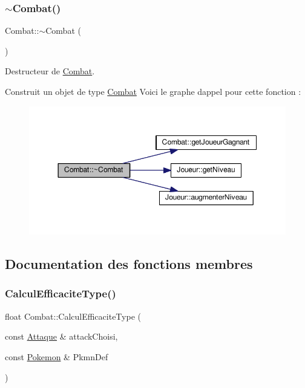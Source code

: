 \subsubsection{\texorpdfstring{$\sim$\+Combat()}{~Combat()}}
{\footnotesize\ttfamily Combat\+::$\sim$\+Combat (\begin{DoxyParamCaption}{ }\end{DoxyParamCaption})}



Destructeur de \hyperlink{class_combat}{Combat}. 

Construit un objet de type \hyperlink{class_combat}{Combat} Voici le graphe d\textquotesingle{}appel pour cette fonction \+:\nopagebreak
\begin{figure}[H]
\begin{center}
\leavevmode
\includegraphics[width=350pt]{class_combat_a044df77ec24b76ca8b1cc3dde0de5049_cgraph}
\end{center}
\end{figure}


\subsection{Documentation des fonctions membres}
\mbox{\label{class_combat_a0bd1f896d7e1667fd5ea86658d30d2c9}} 
\subsubsection{\texorpdfstring{Calcul\+Efficacite\+Type()}{CalculEfficaciteType()}}
{\footnotesize\ttfamily float Combat\+::\+Calcul\+Efficacite\+Type (\begin{DoxyParamCaption}\item[{const \hyperlink{class_attaque}{Attaque} \&}]{attack\+Choisi,  }\item[{const \hyperlink{class_pokemon}{Pokemon} \&}]{Pkmn\+Def }\end{DoxyParamCaption})\hspace{0.3cm}{\ttfamily [private]}}



